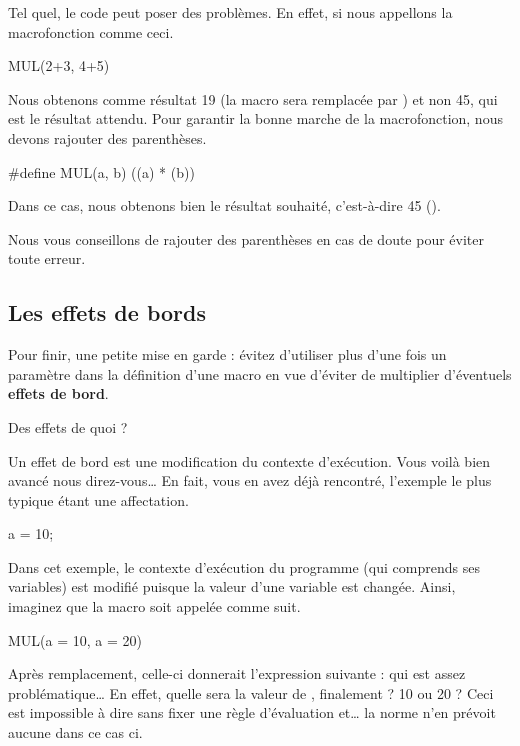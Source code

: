 Tel quel, le code peut poser des problèmes. En effet, si nous appellons
la macrofonction comme ceci.

\begin{C}
MUL(2+3, 4+5)
\end{C}

Nous obtenons comme résultat 19 (la macro sera remplacée par
) et non 45, qui est le résultat attendu.
Pour garantir la bonne marche de la macrofonction, nous devons rajouter
des parenthèses.

\begin{C}
#define MUL(a, b)  ((a) * (b))
\end{C}

Dans ce cas, nous obtenons bien le résultat souhaité, c'est-à-dire 45
().

\begin{infobox}
  Nous vous conseillons de rajouter des
parenthèses en cas de doute pour éviter toute erreur.
\end{infobox}


\subsection{Les effets de bords}
\label{les-effets-de-bords}

Pour finir, une petite mise en garde : évitez d'utiliser plus d'une fois
un paramètre dans la définition d'une macro en vue d'éviter de
multiplier d'éventuels \textbf{effets de bord}.

\begin{questionbox}
  Des effets de quoi ?
\end{questionbox}


Un effet de bord est une modification du contexte d'exécution. Vous
voilà bien avancé nous direz-vous\ldots{} En fait, vous en avez déjà
rencontré, l'exemple le plus typique étant une affectation.

\begin{C}
a = 10;
\end{C}

Dans cet exemple, le contexte d'exécution du programme (qui comprends
ses variables) est modifié puisque la valeur d'une variable est changée.
Ainsi, imaginez que la macro  soit appelée comme suit.

\begin{C}
MUL(a = 10, a = 20)
\end{C}

Après remplacement, celle-ci donnerait l'expression suivante :
 qui est assez problématique\ldots{}
En effet, quelle sera la valeur de , finalement ? 10 ou 20 ?
Ceci est impossible à dire sans fixer une règle d'évaluation et\ldots{}
la norme n'en prévoit aucune dans ce cas ci.

